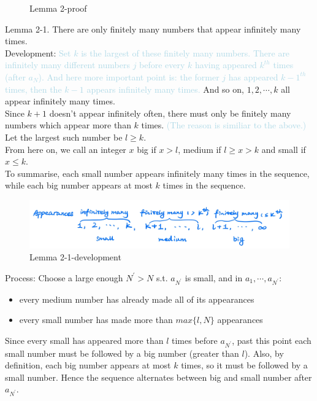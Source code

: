 \documentclass{Math_Note}
\begin{document}
\begin{sol}
\begin{figure}[H]
    \caption{Lemma 2-proof}
\end{figure}
Lemma 2-1. There are only finitely many numbers that appear infinitely many times. \\
\marginpar{\textcolor{green}{idea}}
Development: 
\textcolor{lightblue}{Set $k$ is the largest of these finitely many numbers. There are infinitely many different numbers $j$ before every $k$ having appeared $k^{th}$ times (after $a_{N}$). 
And here more important point is: the former $j$ has appeared $k-1^{th}$ times, then the $k-1$ appears infinitely many times.} And so on, $1, 2,\cdots, k$ all appear infinitely many times. \\
Since $k+1$ doesn't appear infinitely often, there must only be finitely many numbers which appear more than $k$ times. \textcolor{lightblue}{(The reason is similiar to the above.)} Let the largest such number be $l\geq k$. \\
From here on, we call an integer $x$ big if $x>l$, medium if $l\geq x>k$ and small if $x\leq k$. \\
To summarise, each small number appears infinitely many times in the sequence, while each big number appears at most $k$ times in the sequence. \\
\begin{figure}[H]
    \centering
    \includegraphics[scale=0.25]{"./Figures/Q3F2.png"}
    \caption{Lemma 2-1-development}
\end{figure}
\marginpar{\textcolor{green}{method}}
Process: 
Choose a large enough $N^{'}>N$ s.t. $a_{N^{'}}$ is small, and in $a_{1},\cdots,a_{N^{'}}$: 
\begin{itemize}
    \item every medium number has already made all of its appearances
    \item every small number has made more than $max\{l,N\}$ appearances
\end{itemize}
Since every small has appeared more than $l$ times before $a_{N^{'}}$, past this point each small number must be followed by a big number (greater than $l$). Also, by definition, 
each big number appears at most $k$ times, so it must be followed by a small number. Hence the sequence alternates between big and small number after $a_{N^{'}}$. \\

\end{sol}
\end{document}
